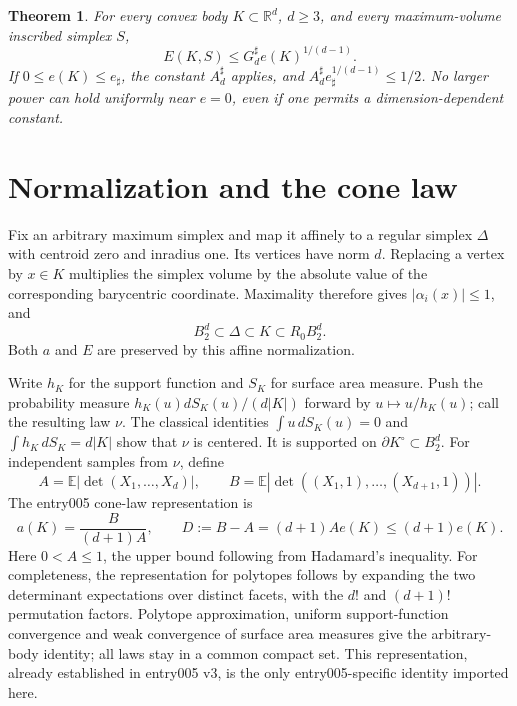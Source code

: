 \documentclass[11pt]{article}
\newtheorem{theorem}{Theorem}
\newcommand{\EE}{\mathbb E}
\newcommand{\BB}{B_2^d}
\begin{document}
\begin{theorem}\label{thm:endpoint}
For every convex body $K\subset\mathbb R^d$, $d\ge3$, and every
maximum-volume inscribed simplex $S$,
\[
 E(K,S)\le G_d^\sharp e(K)^{1/(d-1)}.
\]
If $0\le e(K)\le e_\sharp$, the constant $A_d^\sharp$ applies, and
$A_d^\sharp e_\sharp^{1/(d-1)}\le1/2$.
No larger power can hold uniformly near $e=0$, even if one permits
a dimension-dependent constant.
\end{theorem}

\section{Normalization and the cone law}

Fix an arbitrary maximum simplex and map it affinely to a regular simplex
$\Delta$ with centroid zero and inradius one. Its vertices have norm $d$.
Replacing a vertex by $x\in K$ multiplies the simplex volume by the absolute
value of the corresponding barycentric coordinate. Maximality therefore
gives $|\alpha_i(x)|\le1$, and
\begin{equation}\label{eq:normalization}
 \BB\subset\Delta\subset K\subset R_0\BB.
\end{equation}
Both $a$ and $E$ are preserved by this affine normalization.

Write $h_K$ for the support function and $S_K$ for surface area measure.
Push the probability measure $h_K(u)dS_K(u)/(d|K|)$ forward by
$u\mapsto u/h_K(u)$; call the resulting law $\nu$.
The classical identities $\int u\,dS_K(u)=0$ and
$\int h_K\,dS_K=d|K|$ show that $\nu$ is centered.
It is supported on $\partial K^\circ\subset\BB$.
For independent samples from $\nu$, define
\[
 A=\EE|\det(X_1,\ldots,X_d)|,\qquad
 B=\EE|\det((X_1,1),\ldots,(X_{d+1},1))|.
\]
The entry005 cone-law representation is
\begin{equation}\label{eq:cone}
 a(K)=\frac{B}{(d+1)A},\qquad
 D:=B-A=(d+1)Ae(K)\le(d+1)e(K).
\end{equation}
Here $0<A\le1$, the upper bound following from Hadamard's inequality.
For completeness, the representation for polytopes follows by expanding
the two determinant expectations over distinct facets, with the $d!$
and $(d+1)!$ permutation factors. Polytope approximation, uniform
support-function convergence and weak convergence of surface area measures
give the arbitrary-body identity; all laws stay in a common compact set.
This representation, already established in entry005 v3, is the only
entry005-specific identity imported here.
\end{document}
